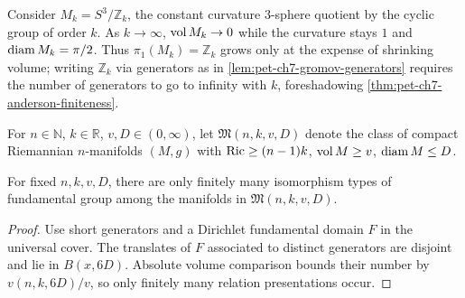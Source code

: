 \begin{example}
  \label{ex:pet-ch7-lens-spaces-example}
  Consider $M_k=S^3/\mathbb{Z}_k$, the constant curvature $3$-sphere quotient by
  the cyclic group of order $k$. As $k\to\infty$, $\operatorname{vol} M_k\to0$ while the
  curvature stays $1$ and $\operatorname{diam} M_k=\pi/2$. Thus $\pi_1(M_k)=\mathbb{Z}_k$ grows
  only at the expense of shrinking volume; writing $\mathbb{Z}_k$ via generators as
  in \cref{lem:pet-ch7-gromov-generators} requires the number of generators to
  go to infinity with $k$, foreshadowing \cref{thm:pet-ch7-anderson-finiteness}.
\end{example}

\begin{definition}
  \label{def:pet-ch7-manifold-class}
  For $n\in\mathbb{N}$, $k\in\mathbb{R}$, $v,D\in(0,\infty)$, let
  $\mathfrak{M}(n,k,v,D)$ denote the class of compact Riemannian $n$-manifolds
  $(M,g)$ with $\operatorname{Ric}\ge(n-1)k$, $\operatorname{vol} M\ge v$, $\operatorname{diam} M\le D$.
\end{definition}

\begin{theorem}
  \label{thm:pet-ch7-anderson-finiteness}
  For fixed $n,k,v,D$, there are only finitely many isomorphism types of
  fundamental group among the manifolds in $\mathfrak{M}(n,k,v,D)$.
\end{theorem}
\begin{proof}
  \sketch
  Use short generators and a Dirichlet fundamental domain \(F\) in the universal cover. The translates of \(F\) associated to distinct generators are disjoint and lie in \(B(x,6D)\). Absolute volume comparison bounds their number by \(v(n,k,6D)/v\), so only finitely many relation presentations occur.
\end{proof}

